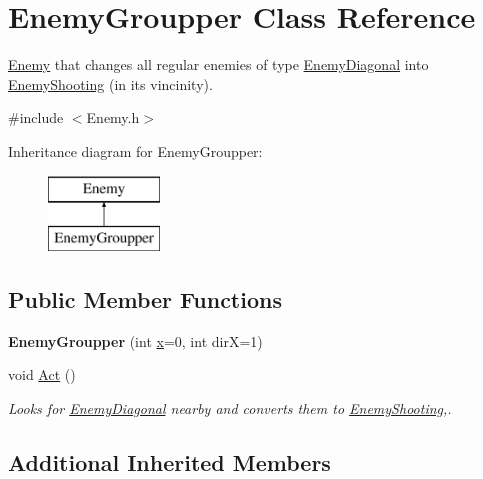 \hypertarget{class_enemy_groupper}{}\section{Enemy\+Groupper Class Reference}
\label{class_enemy_groupper}


\hyperlink{class_enemy}{Enemy} that changes all regular enemies of type \hyperlink{class_enemy_diagonal}{Enemy\+Diagonal} into \hyperlink{class_enemy_shooting}{Enemy\+Shooting} (in its vincinity).  




{\ttfamily \#include $<$Enemy.\+h$>$}

Inheritance diagram for Enemy\+Groupper\+:\begin{figure}[H]
\begin{center}
\leavevmode
\includegraphics[height=2.000000cm]{class_enemy_groupper}
\end{center}
\end{figure}
\subsection*{Public Member Functions}
\begin{DoxyCompactItemize}
\item 
\mbox{\label{class_enemy_groupper_a323134bc15ad87e603e75362e71ff7a8}} 
{\bfseries Enemy\+Groupper} (int \hyperlink{class_enemy_a05e9e91e87d6eae0da31cc6d78a0b43d}{x}=0, int dirX=1)
\item 
\mbox{\label{class_enemy_groupper_a2c322b4ff5a8d0540d7f20cb3e60c387}} 
void \hyperlink{class_enemy_groupper_a2c322b4ff5a8d0540d7f20cb3e60c387}{Act} ()
\begin{DoxyCompactList}\small\item\em Looks for \hyperlink{class_enemy_diagonal}{Enemy\+Diagonal} nearby and converts them to \hyperlink{class_enemy_shooting}{Enemy\+Shooting},. \end{DoxyCompactList}\end{DoxyCompactItemize}
\subsection*{Additional Inherited Members}



